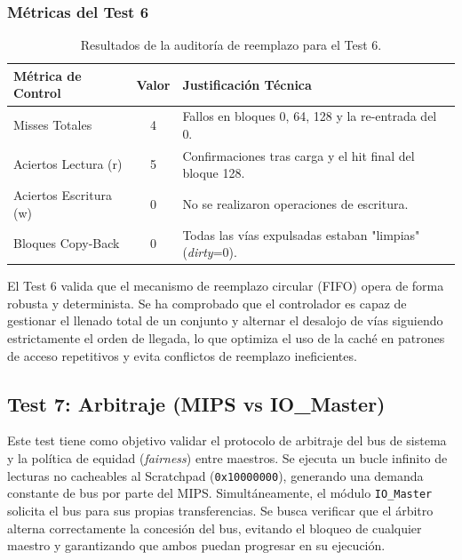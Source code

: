 \documentclass[12pt,a4paper]{article}
\begin{document}
\subsubsection{Métricas del Test 6}

\begin{table}[H]
\centering
\small
\renewcommand{\arraystretch}{1.2}
\begin{tabular}{|l|c|l|}
\hline
\rowcolor[HTML]{EFEFEF} 
\textbf{Métrica de Control} & \textbf{Valor} & \textbf{Justificación Técnica} \\ \hline
Misses Totales & 4 & Fallos en bloques 0, 64, 128 y la re-entrada del 0. \\ \hline
Aciertos Lectura (r) & 5 & Confirmaciones tras carga y el hit final del bloque 128. \\ \hline
Aciertos Escritura (w) & 0 & No se realizaron operaciones de escritura. \\ \hline
Bloques Copy-Back & 0 & Todas las vías expulsadas estaban "limpias" (\textit{dirty}=0). \\ \hline
\end{tabular}
\caption{Resultados de la auditoría de reemplazo para el Test 6.}
\label{tab:audit_test6}
\end{table}

El Test 6 valida que el mecanismo de reemplazo circular (FIFO) opera de forma robusta y determinista. Se ha comprobado que el controlador es capaz de gestionar el llenado total de un conjunto y alternar el desalojo de vías siguiendo estrictamente el orden de llegada, lo que optimiza el uso de la caché en patrones de acceso repetitivos y evita conflictos de reemplazo ineficientes.

\subsection{Test 7: Arbitraje (MIPS vs IO\_Master)}

 Este test tiene como objetivo validar el protocolo de arbitraje del bus de sistema y la política de equidad (\textit{fairness}) entre maestros. Se ejecuta un bucle infinito de lecturas no cacheables al Scratchpad (\texttt{0x10000000}), generando una demanda constante de bus por parte del MIPS. Simultáneamente, el módulo \texttt{IO\_Master} solicita el bus para sus propias transferencias. Se busca verificar que el árbitro alterna correctamente la concesión del bus, evitando el bloqueo de cualquier maestro y garantizando que ambos puedan progresar en su ejecución.
\end{document}
